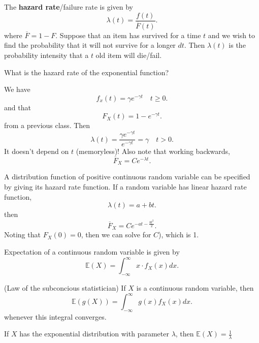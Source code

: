 
\begin{definition}
	The \textbf{hazard rate}/failure rate is given by \[
		\lambda (t) = \frac{f(t)}{\overline{F}(t)}
	.\] where \( \overline{F} = 1 - F \). Suppose that an item has survived for a time \( t \) and we wish to find the probability that it will not survive for a longer \( dt \). Then \( \lambda (t) \) is the probability intensity that a \( t \) old item will die/fail.
\end{definition}

\begin{eg}
	What is the hazard rate of the exponential function?
\end{eg}
\begin{explanation}
	We have \[
		f_x(t) = \gamma e^{-\gamma t}  \quad t \ge 0
	.\] and that \[
		F_X(t) = 1 - e^{-\gamma t} 
	.\] from a previous class. Then \[
		\lambda (t) = \frac{\gamma e^{-\gamma t} }{e^{-\gamma t} } = \gamma \quad  t > 0
	.\] It doesn't depend on \( t \) (memoryless)! Also note that working backwards, \[
		\overline{F}_X = Ce^{-\lambda t} 
	.\] 
\end{explanation}

\begin{eg}
	A distribution function of positive continuous random variable can be specified by giving its hazard rate function. If a random variable has linear hazard rate function, \[
		\lambda (t) = a + bt
	.\] then \[
		\overline{F}_X = Ce^{-at - \frac{bt ^{2} }{2}}  
	.\] Noting that \( F_X(0) = 0 \), then we can solve for \( C \)), which is 1.
\end{eg}

\begin{definition}
	Expectation of a continuous random variable is given by \[
		\mathbb{E}(X) = \int_{-\infty}^{\infty}x\cdot f_X(x)dx 
	.\] 
\end{definition}

\begin{theorem}
	(Law of the subconcious statistician) If \( X \) is a continuous random variable, then \[
		\mathbb{E}(g(X)) = \int_{-\infty}^{\infty}g(x)f_X(x)dx 
	.\] whenever this integral converges.
\end{theorem}

\begin{eg}
	If \( X \) has the exponential distribution with parameter \( \lambda  \), then \( \mathbb{E}(X) = \frac{1}{\lambda } \)
\end{eg}

